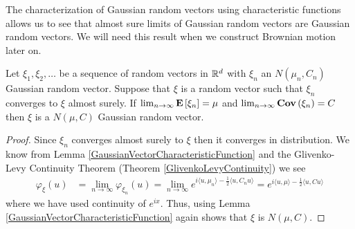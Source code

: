 The characterization of Gaussian random vectors using characteristic
functions allows us to see that almost sure limits of Gaussian random vectors are
Gaussian random vectors.  We will need this result when we construct
Brownian motion later on.
\begin{lem}\label{LimitOfGaussianRandomVectors}Let $\xi_1, \xi_2, \dots$ be a sequence of random
  vectors in $\mathbb{R}^d$ with $\xi_n$ an $N(\mu_n, C_n)$ Gaussian
  random vector.  Suppose that $\xi$ is a random vector such
  that $\xi_n$ converges to $\xi$ almost surely.  If $\lim_{n \to
    \infty} \textbf{E}\left[\xi_n\right] = \mu$ and $\lim_{n \to \infty}
  \textbf{Cov} \left (\xi_n \right ) = C$ then $\xi$ is a $N(\mu, C)$ Gaussian random vector.
\end{lem}
\begin{proof}
Since $\xi_n$ converges almost surely to $\xi$ then it converges in
distribution.  We know from Lemma
\ref{GaussianVectorCharacteristicFunction} and the Glivenko-Levy
Continuity Theorem (Theorem \ref{GlivenkoLevyContinuity}) we see
\begin{align*}
\varphi_\xi(u) &= \lim_{n \to \infty} \varphi_{\xi_n}(u) = \lim_{n \to
  \infty} e^{i\langle u, \mu_n\rangle - \frac{1}{2}\langle u, C_n
  u\rangle} = e^{i\langle u, \mu\rangle - \frac{1}{2}\langle u, C
  u\rangle} 
\end{align*}
where we have used continuity of $e^{ix}$.  Thus, using Lemma
\ref{GaussianVectorCharacteristicFunction}
again shows that $\xi$ is $N(\mu, C)$.


\end{proof}
